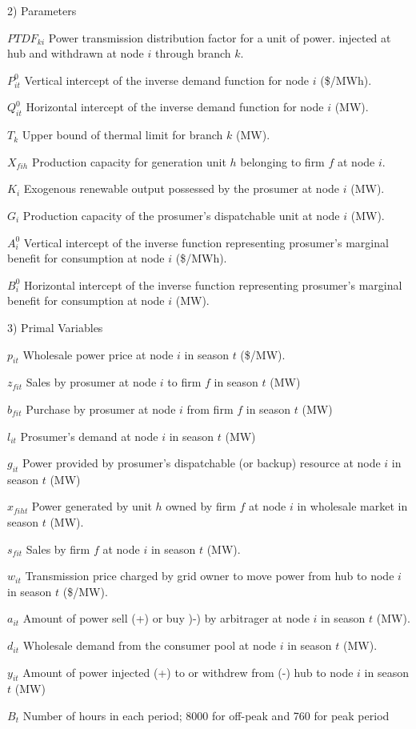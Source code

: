 \documentclass[12pt,onecolumn]{IEEEtran}
\theoremstyle{plain}
\theoremstyle{definition}
\begin{document}
2) Parameters
\begin{IEEEdescription}
\item[$PTDF_{ki}$] Power transmission distribution factor for a unit of power. injected at hub and withdrawn at node $i$ through branch $k$.
\item[$P_{it}^0$] Vertical intercept of the inverse demand function for node $i$ (\$/MWh).
\item[$Q_{it}^0$] Horizontal intercept of the inverse demand function for node $i$ (MW).
\item[$T_k$] Upper bound of thermal limit for branch $k$ (MW).
\item[$X_{fih}$] Production capacity for generation unit $h$ belonging to firm $f$ at node $i$.
\item[$K_i$] Exogenous renewable output possessed by the prosumer at node $i$ (MW).
\item[$G_i$] Production capacity of the prosumer's dispatchable unit at node $i$ (MW).
\item[$A^0_i$] Vertical intercept of the inverse function representing prosumer's marginal benefit for consumption at node $i$ (\$/MWh).
\item[$B^0_i$] Horizontal intercept of the inverse function representing prosumer's marginal benefit for consumption at node $i$ (MW).
\end{IEEEdescription}

3) Primal Variables
\begin{IEEEdescription}
\item[$p_{it}$] Wholesale power price at node $i$ in season $t$ (\$/MW).
\item[$z_{fit}$] Sales by prosumer at node $i$ to firm $f$ in season $t$ (MW)
\item[$b_{fit}$] Purchase by prosumer at node $i$ from firm $f$ in season $t$ (MW)
\item[$l_{it}$] Prosumer's demand at node $i$ in season $t$ (MW)
\item[$g_{it}$] Power provided by prosumer's dispatchable (or backup) resource at node $i$ in season $t$ (MW)
\item[$x_{fiht}$] Power generated by unit $h$ owned by firm $f$ at node $i$ in wholesale market in season $t$ (MW).
\item[$s_{fit}$] Sales by firm $f$ at node $i$ in season $t$ (MW).
\item[$w_{it}$] Transmission price charged by grid owner to move power from hub to node $i$ in season $t$ (\$/MW).
\item[$a_{it}$] Amount of power sell (+) or buy )-) by arbitrager at node $i$ in season $t$ (MW).
\item[$d_{it}$] Wholesale demand from the consumer pool at node $i$ in season $t$ (MW).
\item[$y_{it}$] Amount of power injected (+) to or withdrew from (-) hub to node $i$ in season $t$ (MW)
\item[$B_t$] Number of hours in each period; 8000 for off-peak and 760 for peak period
\end{IEEEdescription}
\end{document}
